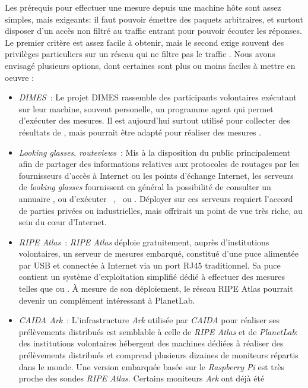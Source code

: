 Les prérequis pour effectuer une mesure \udpping depuis une machine hôte sont
assez simples, mais exigeants: il faut pouvoir émettre des paquets \udp
arbitraires, et surtout disposer d'un accès non filtré au traffic \icmp entrant
pour pouvoir écouter les réponses. Le premier critère est assez facile à
obtenir, mais le second exige souvent des privilèges particuliers sur un réseau
qui ne filtre pas le traffic \icmp. Nous avons envisagé plusieurs options, dont
certaines sont plus ou moins faciles à mettre en oeuvre :
\begin{itemize}
  \item {\em DIMES}~\cite{dimes}: Le projet DIMES rassemble des
  participants volontaires exécutant sur leur machine, souvent personelle, un programme agent qui permet
  d'exécuter des mesures. Il est aujourd'hui surtout utilisé pour collecter des
  résultats de \traceroute, mais pourrait être adapté pour réaliser des mesures
  \udpping.
  \item {\em Looking glasses}, {\em routeviews}~\cite{routeviews}: Mis à la
  disposition du public principalement afin de partager des informations
  relatives aux protocoles de routages par les fournisseurs d'accès à Internet
  ou les points d'échange Internet, les serveurs de {\em looking glasses} fournissent en général la possibilité de consulter
  un annuaire \bgp, ou d'exécuter \icmp~\ping, \tcp~\ping ou \traceroute.
  Déployer \udpping sur ces serveurs requiert l'accord de parties privées ou
  industrielles, mais offrirait un point de vue très riche, au sein du c\oe{}ur
  d'Internet.
  \item {\em RIPE Atlas}~\cite{ripeatlas}: {\em RIPE Atlas} déploie
  gratuitement, auprès d'institutions volontaires, un serveur de mesures embarqué, constitué d'une
  puce alimentée par USB et connectée à Internet via un port RJ45 traditionnel.
  Sa puce contient un système d'exploitation simplifié dédié à effectuer des
  mesures telles que \ping ou \traceroute. À mesure de son déploiement, le
  réseau RIPE Atlas pourrait devenir un complément intéressant à
  PlanetLab.
  \item {\em CAIDA Ark}~\cite{caida}: L'infrastructure {\em Ark} utilisée par
  {\em CAIDA} pour réaliser ses prélèvements \traceroute distribués est
  semblable à celle de {\em RIPE Atlas} et de {\em PlanetLab}: des institutions
  volontaires hébergent des machines dédiées à réaliser des prélèvements
  distribués et comprend plusieurs dizaines de moniteurs répartis dans le monde.
  Une version embarquée basée sur le {\em Raspberry Pi} est très proche des sondes {\em RIPE Atlas}. Certains moniteurs {\em Ark} ont déjà été

\end{itemize}
